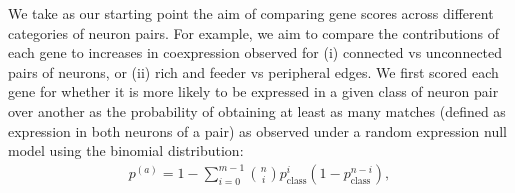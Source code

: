 \documentclass[10pt,letterpaper]{article}
\begin{document}
We take as our starting point the aim of comparing gene scores across different categories of neuron pairs.
For example, we aim to compare the contributions of each gene to increases in coexpression observed for (i) connected vs unconnected pairs of neurons, or (ii) rich and feeder vs peripheral edges.
We first scored each gene for whether it is more likely to be expressed in a given class of neuron pair over another as the probability of obtaining at least as many matches (defined as expression in both neurons of a pair) as observed under a random expression null model using the binomial distribution:
\begin{eqnarray}
	\label{eq:CBinomialProbability}
     p^{(a)} = 1 - \sum_{i=0}^{m-1}\binom{n}{i} p_\mathrm{class}^{i}(1-p_\mathrm{class}^{n-i}),
\end{eqnarray}
\end{document}
